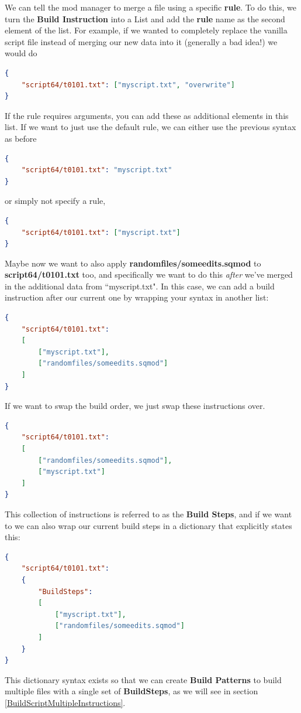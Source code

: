 \documentclass{article}
\begin{document}
We can tell the mod manager to merge a file using a specific \textbf{rule}. To do this, we turn the \textbf{Build Instruction} into a List and add the \textbf{rule} name as the second element of the list. For example, if we wanted to completely replace the vanilla script file instead of merging our new data into it (generally a bad idea!) we would do
\begin{lstlisting}[language=json,firstnumber=1]
{
    "script64/t0101.txt": ["myscript.txt", "overwrite"]
}
\end{lstlisting}
\noindent
If the rule requires arguments, you can add these as additional elements in this list.
If we want to just use the default rule, we can either use the previous syntax as before
\begin{lstlisting}[language=json,firstnumber=1]
{
    "script64/t0101.txt": "myscript.txt"
}
\end{lstlisting}
or simply not specify a rule,
\begin{lstlisting}[language=json,firstnumber=1]
{
    "script64/t0101.txt": ["myscript.txt"]
}
\end{lstlisting}
Maybe now we want to also apply \textbf{randomfiles/someedits.sqmod} to \textbf{script64/t0101.txt} too, and specifically we want to do this \textit{after} we've merged in the additional data from ``myscript.txt". In this case, we can add a build instruction after our current one by wrapping your syntax in another list:
\begin{lstlisting}[language=json,firstnumber=1]
{
    "script64/t0101.txt":
    [
        ["myscript.txt"],
        ["randomfiles/someedits.sqmod"]
    ]
}
\end{lstlisting}
If we want to swap the build order, we just swap these instructions over.
\begin{lstlisting}[language=json,firstnumber=1]
{
    "script64/t0101.txt":
    [
        ["randomfiles/someedits.sqmod"],
        ["myscript.txt"]
    ]
}
\end{lstlisting}
This collection of instructions is referred to as the \textbf{Build Steps}, and if we want to we can also wrap our current build steps in a dictionary that explicitly states this:
\begin{lstlisting}[language=json,firstnumber=1]
{
    "script64/t0101.txt":
    {
        "BuildSteps":
        [
            ["myscript.txt"],
            ["randomfiles/someedits.sqmod"]
        ]
    }
}
\end{lstlisting}
This dictionary syntax exists so that we can create \textbf{Build Patterns} to build multiple files with a single set of \textbf{BuildSteps}, as we will see in section \ref{BuildScriptMultipleInstructions}.
\end{document}
